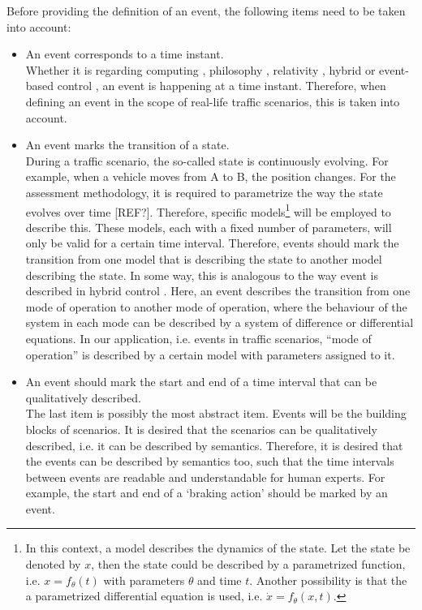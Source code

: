 Before providing the definition of an event, the following items need to be taken into account:
\begin{itemize}
	\item An event corresponds to a time instant.\\
	Whether it is regarding computing \cite{breu1997towards}, philosophy \cite{kim1993supervenience}, relativity \cite{sartori1996understanding}, hybrid or event-based control \cite{branicky1998hybridcontrol, deschutter2003hybrid, heemels2012eventcontrol}, an event is happening at a time instant. Therefore, when defining an event in the scope of real-life traffic scenarios, this is taken into account.
	
	\item An event marks the transition of a state.\\
	During a traffic scenario, the so-called state is continuously evolving. For example, when a vehicle moves from A to B, the position changes. For the assessment methodology, it is required to parametrize the way the state evolves over time [REF?]. Therefore, specific models\footnote{\label{note:model}In this context, a model describes the dynamics of the state. Let the state be denoted by $x$, then the state could be described by a parametrized function, i.e. $x = f_{\theta}(t)$ with parameters $\theta$ and time $t$. Another possibility is that the a parametrized differential equation is used, i.e. $\dot{x} = f_{\theta}(x, t)$.} will be employed to describe this. These models, each with a fixed number of parameters, will only be valid for a certain time interval. Therefore, events should mark the transition from one model that is describing the state to another model describing the state. In some way, this is analogous to the way event is described in hybrid control \cite{deschutter2003hybrid}. Here, an event describes the transition from one mode of operation to another mode of operation, where the behaviour of the system in each mode can be described by a system of difference or differential equations. In our application, i.e. events in traffic scenarios, ``mode of operation'' is described by a certain model with parameters assigned to it.
	
	\item An event should mark the start and end of a time interval that can be qualitatively described.\\
	The last item is possibly the most abstract item. Events will be the building blocks of scenarios. It is desired that the scenarios can be qualitatively described, i.e. it can be described by semantics. Therefore, it is desired that the events can be described by semantics too, such that the time intervals between events are readable and understandable for human experts. For example, the start and end of a `braking action' should be marked by an event. 
\end{itemize}

